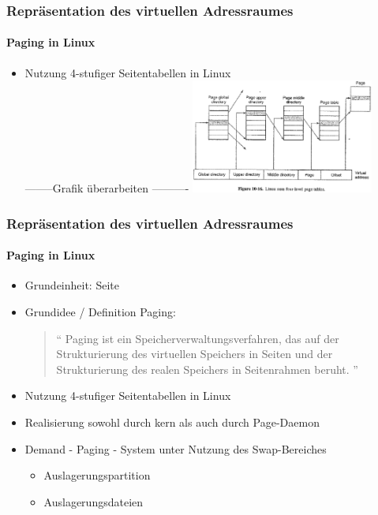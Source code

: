 \documentclass[ddcfooter]{tudbeamer}
\begin{document}
\begin{frame}
    \frametitle{Repräsentation des virtuellen Adressraumes}
    \framesubtitle {Paging in Linux}
    \begin{itemize}
         \item Nutzung 4-stufiger Seitentabellen in Linux\\
         --------Grafik überarbeiten ----------
	\includegraphics[width=6cm]{Seitentab.eps} 		
    
    
     \end{itemize}
    
\end{frame}


\begin{frame}
 
    \frametitle {Repräsentation des virtuellen Adressraumes}
    
    \framesubtitle {Paging in Linux}
    \begin{itemize}
         \item  Grundeinheit: Seite
         \item Grundidee / Definition Paging: \\
        \begin{quote}
         \textquotedblleft
         Paging ist ein Speicherverwaltungsverfahren, das auf der Strukturierung  des virtuellen Speichers 	in Seiten und der Strukturierung des realen Speichers in Seitenrahmen beruht.
    	\textquotedblright 	\end{quote}
 	 \item Nutzung 4-stufiger Seitentabellen in Linux
	 \item Realisierung sowohl durch kern als auch durch Page-Daemon
	 \item Demand - Paging - System unter Nutzung des Swap-Bereiches
	 \begin{itemize}
	 	\item Auslagerungspartition 
		\item Auslagerungsdateien
	\end{itemize}
    
    
     \end{itemize}
    
\end{frame}
\end{document}
